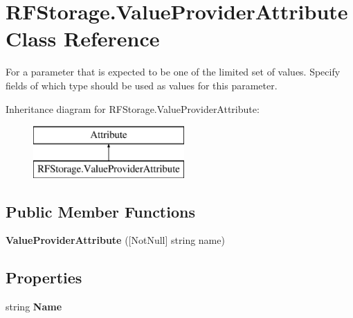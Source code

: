 \hypertarget{class_r_f_storage_1_1_value_provider_attribute}{}\section{R\+F\+Storage.\+Value\+Provider\+Attribute Class Reference}
\label{class_r_f_storage_1_1_value_provider_attribute}


For a parameter that is expected to be one of the limited set of values. Specify fields of which type should be used as values for this parameter.  


Inheritance diagram for R\+F\+Storage.\+Value\+Provider\+Attribute\+:\begin{figure}[H]
\begin{center}
\leavevmode
\includegraphics[height=2.000000cm]{class_r_f_storage_1_1_value_provider_attribute}
\end{center}
\end{figure}
\subsection*{Public Member Functions}
\begin{DoxyCompactItemize}
\item 
\mbox{\label{class_r_f_storage_1_1_value_provider_attribute_a6349c186ae9ab018ba7f80c3cdc13886}} 
{\bfseries Value\+Provider\+Attribute} (\mbox{[}Not\+Null\mbox{]} string name)
\end{DoxyCompactItemize}
\subsection*{Properties}
\begin{DoxyCompactItemize}
\item 
\mbox{\label{class_r_f_storage_1_1_value_provider_attribute_a567d385bcc69ded8e020d4371ee729cb}} 
string {\bfseries Name}
\end{DoxyCompactItemize}


